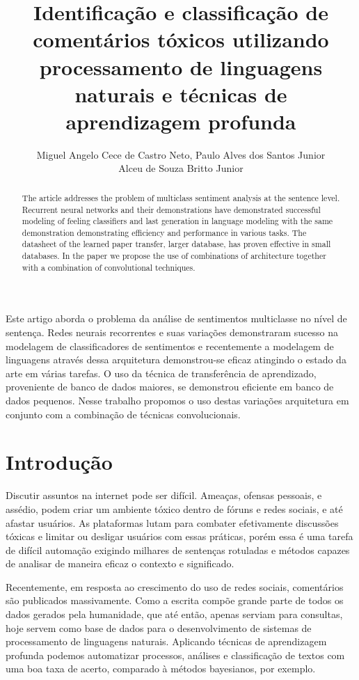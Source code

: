 \documentclass[12pt]{article}
\title{Identificação e classificação de comentários tóxicos utilizando processamento de linguagens naturais e técnicas de aprendizagem profunda}
\author{
    Miguel Angelo Cece de Castro Neto\inst{1},
    Paulo Alves dos Santos Junior\inst{1}\\
    Alceu de Souza Britto Junior\inst{2}
}
\begin{document}
\maketitle

\begin{abstract}
  The article addresses the problem of multiclass sentiment analysis at the sentence level. Recurrent neural networks and their demonstrations have demonstrated successful modeling of feeling classifiers and last generation in language modeling with the same demonstration demonstrating efficiency and performance in various tasks. The datasheet of the learned paper transfer, larger database, has proven effective in small databases. In the paper we propose the use of combinations of architecture together with a combination of convolutional techniques.
\end{abstract}

\begin{resumo}
  Este artigo aborda o problema da análise de sentimentos multiclasse no nível de sentença. Redes neurais recorrentes e suas variações demonstraram sucesso na modelagem de classificadores de sentimentos e recentemente a modelagem de linguagens através dessa arquitetura demonstrou-se eficaz atingindo o estado da arte em várias tarefas. O uso da técnica de transferência de aprendizado, proveniente de banco de dados maiores, se demonstrou eficiente em banco de dados pequenos. Nesse trabalho propomos o uso destas variações arquitetura em conjunto com a combinação de técnicas convolucionais.
\end{resumo}


\section{Introdução} \label{sec:introducao}

Discutir assuntos na internet pode ser difícil. Ameaças, ofensas pessoais, e assédio, podem criar um ambiente tóxico dentro de fóruns e redes sociais, e até afastar usuários. As plataformas lutam para combater efetivamente discussões tóxicas e limitar ou desligar usuários com essas práticas, porém essa é uma tarefa de difícil automação exigindo milhares de sentenças rotuladas e métodos capazes de analisar de maneira eficaz o contexto e significado.

Recentemente, em resposta ao crescimento do uso de redes sociais, comentários são publicados massivamente. Como a escrita compõe grande parte de todos os dados gerados pela humanidade, que até então, apenas serviam para consultas, hoje servem como base de dados para o desenvolvimento de sistemas de processamento de linguagens naturais. Aplicando técnicas de aprendizagem profunda podemos automatizar processos, análises e classificação de textos com uma boa taxa de acerto, comparado à métodos bayesianos, por exemplo.
\end{document}
